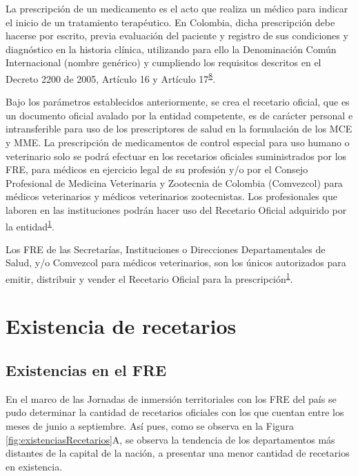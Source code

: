 \documentclass[
]{book}
\begin{document}
La prescripción de un medicamento es el acto que realiza un médico para indicar el inicio de un tratamiento terapéutico. En Colombia, dicha prescripción debe hacerse por escrito, previa evaluación del paciente y registro de sus condiciones y diagnóstico en la historia clínica, utilizando para ello la Denominación Común Internacional (nombre genérico) y cumpliendo los requisitos descritos en el Decreto 2200 de 2005, Artículo 16 y Artículo 17\textsuperscript{\protect\hyperlink{ref-MSPS2200-2005}{8}}.

Bajo los parámetros establecidos anteriormente, se crea el recetario oficial, que es un documento oficial avalado por la entidad competente, es de carácter personal e intransferible para uso de los prescriptores de salud en la formulación de los MCE y MME. La prescripción de medicamentos de control especial para uso humano o veterinario solo se podrá efectuar en los recetarios oficiales suministrados por los FRE, para médicos en ejercicio legal de su profesión y/o por el Consejo Profesional de Medicina Veterinaria y Zootecnia de Colombia (Comvezcol) para médicos veterinarios y médicos veterinarios zootecnistas. Los profesionales que laboren en las instituciones podrán hacer uso del Recetario Oficial adquirido por la entidad\textsuperscript{\protect\hyperlink{ref-MSPS1478-2006}{1}}.

Los FRE de las Secretarías, Instituciones o Direcciones Departamentales de Salud, y/o Comvezcol para médicos veterinarios, son los únicos autorizados para emitir, distribuir y vender el Recetario Oficial para la prescripción\textsuperscript{\protect\hyperlink{ref-MSPS1478-2006}{1}}.

\hypertarget{existencia-de-recetarios}{%
\section{Existencia de recetarios}\label{existencia-de-recetarios}}

\hypertarget{existencias-en-el-fre}{%
\subsection{Existencias en el FRE}\label{existencias-en-el-fre}}

En el marco de las Jornadas de inmersión territoriales con los FRE del país se pudo determinar la cantidad de recetarios oficiales con los que cuentan entre los meses de junio a septiembre. Así pues, como se observa en la Figura \ref{fig:existenciasRecetarios}A, se observa la tendencia de los departamentos más distantes de la capital de la nación, a presentar una menor cantidad de recetarios en existencia.
\end{document}
